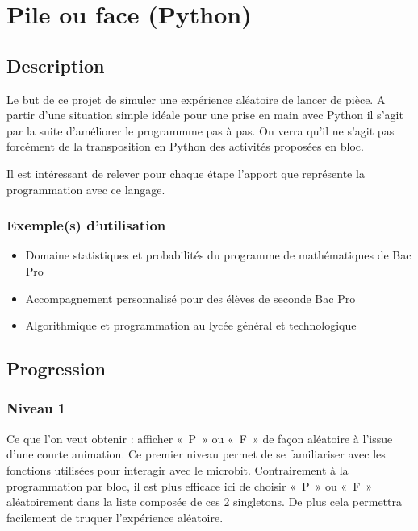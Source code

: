 \documentclass[letterpaper,10pt,french]{sphinxmanual}
\begin{document}
\noindent{}


\section{Pile ou face (Python)}
\label{\detokenize{decouverte/pileface-python:pile-ou-face-python}}\label{\detokenize{decouverte/pileface-python::doc}}\label{\detokenize{decouverte/pileface-python:pythonpileface}}

\subsection{Description}
\label{\detokenize{decouverte/pileface-python:description}}
Le but de ce projet de simuler une expérience aléatoire de lancer de pièce.
A partir d’une situation simple idéale pour une prise en main avec Python
il s’agit par la suite d’améliorer le programmme pas à pas.
{\hyperref[\detokenize{decouverte/pileface-bloc:blocpileface}]{}}
On verra qu’il ne s’agit pas forcément de la transposition en Python des activités
proposées en bloc.

Il est intéressant de relever pour chaque étape l’apport que représente la programmation
avec  ce langage.


\subsubsection{Exemple(s) d’utilisation}
\label{\detokenize{decouverte/pileface-python:exemple-s-d-utilisation}}\begin{itemize}
\item {} 
Domaine statistiques et probabilités du programme de mathématiques de Bac Pro

\item {} 
Accompagnement personnalisé pour des élèves de seconde Bac Pro

\item {} 
Algorithmique et programmation au lycée général et technologique

\end{itemize}


\subsection{Progression}
\label{\detokenize{decouverte/pileface-python:progression}}

\subsubsection{Niveau 1}
\label{\detokenize{decouverte/pileface-python1:niveau-1}}\label{\detokenize{decouverte/pileface-python1::doc}}
Ce que l’on veut obtenir : afficher « P » ou « F » de façon aléatoire à l’issue d’une courte animation.
Ce premier niveau permet de se familiariser avec les fonctions utilisées pour interagir avec le microbit.
Contrairement à la programmation par bloc, il est plus efficace ici de choisir « P » ou « F »
aléatoirement dans la liste composée de ces 2 singletons.
De plus cela permettra facilement de truquer l’expérience aléatoire.
\end{document}
